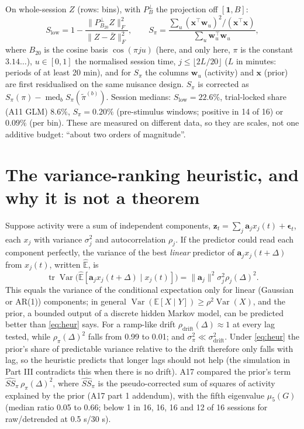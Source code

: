 \documentclass[11pt]{article}
\newcommand{\E}{\mathbb{E}}
\newcommand{\Var}{\operatorname{Var}}
\newcommand{\tr}{\operatorname{tr}}
\newcommand{\med}{\operatorname{med}}
\begin{document}
On whole-session $Z$ (rows: bins), with $P^\perp_B$ the projection off $[\bm 1, B]$:
\begin{equation}
S_{\mathrm{low}} = 1 - \frac{\|P^\perp_{B_{20}} Z\|_F^2}{\|Z - \bar Z\|_F^2},
\qquad
S_\pi = \frac{\sum_u (\bm x^\top \bm w_u)^2 / (\bm x^\top \bm x)}{\sum_u \bm w_u^\top \bm w_u},
\end{equation}
where $B_{20}$ is the cosine basis $\cos(\pi j u)$ (here, and only here, $\pi$ is the constant $3.14\ldots$),
$u \in [0,1]$ the normalised session time, $j \le \lfloor 2L/20 \rfloor$ ($L$ in minutes: periods of at least 20 min), and for $S_\pi$ the columns $\bm w_u$ (activity) and $\bm x$
(prior) are first residualised on the same nuisance design. $S_\pi$ is corrected as $S_\pi(\pi) - \med_b S_\pi(\tilde
\pi^{(b)})$. Session medians: $S_{\mathrm{low}} = 22.6\%$, trial-locked share (A11 GLM) $8.6\%$, $S_\pi = 0.20\%$
(pre-stimulus windows; positive in 14 of 16) or $0.09\%$ (per bin). These are measured on different data, so they are
scales, not one additive budget: ``about two orders of magnitude''.

\section{The variance-ranking heuristic, and why it is not a theorem}

Suppose activity were a sum of independent components, $\bm z_t = \sum_j \bm a_j x_j(t) + \bm\epsilon_t$, each
$x_j$ with variance $\sigma_j^2$ and autocorrelation $\rho_j$. If the predictor could read each component perfectly,
the variance of the best \emph{linear} predictor of $\bm a_j x_j(t+\Delta)$ from $x_j(t)$, written $\hat{\E}$, is
\begin{equation}
\tr\Var\big(\hat{\E}[\bm a_j x_j(t+\Delta) \mid x_j(t)]\big) = \|\bm a_j\|^2 \sigma_j^2 \rho_j(\Delta)^2 .
\label{eq:heur}
\end{equation}
This equals the variance of the conditional expectation only for linear (Gaussian or AR(1)) components; in general
$\Var(\E[X \mid Y]) \ge \rho^2 \Var(X)$, and the prior, a bounded output of a discrete hidden Markov model, can be
predicted better than \eqref{eq:heur} says. For a ramp-like drift $\rho_{\mathrm{drift}}(\Delta) \approx 1$ at every
lag tested, while $\rho_\pi(\Delta)^2$ falls from 0.99 to 0.01; and $\sigma_\pi^2 \ll \sigma_{\mathrm{drift}}^2$. Under
\eqref{eq:heur} the prior's share of predictable variance relative to the drift therefore only falls with lag, so the
heuristic predicts that longer lags should not help (the simulation in Part III contradicts this when there is no
drift). A17 compared the prior's term $\widehat{SS}_\pi\, \rho_\pi(\Delta)^2$, where $\widehat{SS}_\pi$ is the
pseudo-corrected sum of squares of activity explained by the prior (A17 part 1 addendum), with the fifth eigenvalue
$\mu_5(G)$ (median ratio 0.05 to 0.66; below 1 in 16, 16, 16 and 12 of 16 sessions for raw/detrended at 0.5 s/30 s).
\end{document}
